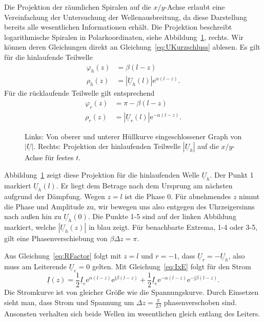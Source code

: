 \documentclass[paper=a4, parskip=half-, ngerman, fontsize=11pt]{scrreprt}
\begin{document}
Die Projektion der räumlichen Spiralen auf die $x/y$-Achse erlaubt eine Vereinfachung der Untersuchung der
Wellenausbreitung, da diese Darstellung bereits alle wesentlichen Informationen erhält. Die Projektion beschreibt
logarithmische Spiralen in Polarkoordinaten, siehe Abbildung~\ref{Spirale}, rechts. Wir können deren Gleichungen direkt
an Gleichung~\eqref{eq:UKurzschluss} ablesen. Es gilt für die hinlaufende Teilwelle
\begin{align*}
    \varphi_{h}(z) &= \beta (l - z) \\[1ex]
    \rho_{h}(z) &= \left| \underline{U}_{h}(l) \right| \mathrm{e}^{\alpha (l - z)}.
\end{align*}
Für die rücklaufende Teilwelle gilt entsprechend
\begin{align*}
    \varphi_{r}(z) &= \pi - \beta (l - z) \\[1ex]
    \rho_{r}(z) &= \left| \underline{U}_{r}(l) \right| \mathrm{e}^{- \alpha (l - z)}.
\end{align*}

\begin{figure}[!htb]
    \begin{subfigure}[b]{0.49\textwidth}
        \centering
        
    \end{subfigure}%
    \hfill
    \begin{subfigure}[b]{0.4\textwidth}
        \centering
        
    \end{subfigure}
    \caption{Links: Von oberer und unterer Hüllkurve eingeschlossener Graph von $\left| \underline{U} \right|$. Rechts:
    Projektion der hinlaufenden Teilwelle $\left| \underline{U}_h \right|$ auf die $x/y$-Achse für festes $t$.}
    \label{Spirale}
\end{figure}
Abbildung~\ref{Spirale} zeigt diese Projektion für die hinlaufenden Welle $\underline{U}_{h}$. Der Punkt 1 markiert
$\underline{U}_{h}(l)$. Er liegt dem Betrage nach dem Ursprung am nächsten aufgrund der Dämpfung. Wegen $z=l$ ist die
Phase 0. Für abnehmendes $z$ nimmt die Phase und Amplitude zu, wir bewegen uns also entgegen des Uhrzeigersinns nach
außen hin zu $\underline{U}_{h}(0)$. Die Punkte 1-5 sind auf der linken Abbildung markiert, welche
$|\underline{U}_{h}(z)|$ in blau zeigt. Für benachbarte Extrema, 1-4 oder 3-5, gilt eine Phasenverschiebung von $\beta
\Delta z
= \pi$.

Aus Gleichung~\eqref{eq:RFactor} folgt mit $z=l$ und $r=-1$, dass $\underline{U}_{r} = - \underline{U}_{h}$, also muss
am Leiterende $\underline{U}_{e} = 0$ gelten. Mit Gleichung~\eqref{eq:IxE} folgt für den Strom
\[
\underline{I}(z) =
\frac{1}{2} \underline{I}_{e} \mathrm{e}^{\alpha (l - z)} \mathrm{e}^{\mathrm{j} \beta (l - z)}
+
\frac{1}{2} \underline{I}_{e} \mathrm{e}^{- \alpha (l - z)} \mathrm{e}^{- \mathrm{j} \beta (l - z)}.
\]
Die Stromkurve ist von gleicher Größe wie die Spannungskurve. Durch Einsetzen sieht man, dass Strom und Spannung um
$\Delta z = \frac{\pi}{2 \beta}$ phasenverschoben sind. Ansonsten verhalten sich beide Wellen im wesentlichen gleich
entlang des Leiters.
\end{document}
